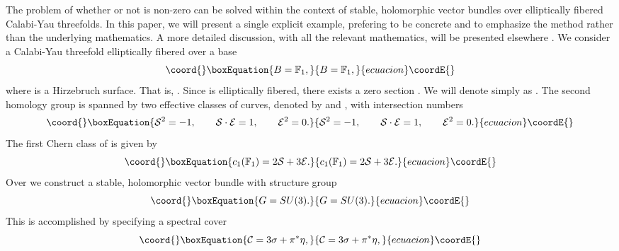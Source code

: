 \documentclass[a4paper,12pt]{article}
\numberwithin{equation}{section}
\theoremstyle{plain}
\begin{document}
The problem of whether or not \coordHE{} is non-zero
can be solved within the context of stable, holomorphic vector bundles
over
elliptically fibered Calabi-Yau threefolds. In this paper, we will present
a single explicit example, prefering to be concrete and to emphasize the
method rather than the underlying mathematics. A more detailed discussion,
with all the relevant mathematics, will be presented elsewhere
\cite{BDOnew}.
We consider a Calabi-Yau threefold \coordHE{} elliptically fibered over a base
%
\begin{equation}\coord{}\boxEquation{
B={\mathbb F}_1,
\label{33}
}{
B={\mathbb F}_1,
}{ecuacion}\coordE{}\end{equation}
%
where \coordHE{} is a Hirzebruch surface. That is,
\coordHE{}. Since \coordHE{} is elliptically fibered, there exists
a zero section \coordHE{}. We will denote
\coordHE{} simply as \myHighlight{$\sigma$}\coordHE{}.
The second homology group \coordHE{} is spanned
by two effective classes of curves, denoted by \coordHE{} and \coordHE{},
with
intersection numbers
%
\begin{equation}\coord{}\boxEquation{
{\cal S}^2 = -1, \qquad {\cal S} \cdot {\cal E} = 1, \qquad
{\cal E}^2 =0.
\label{aaa}
}{
{\cal S}^2 = -1, \qquad {\cal S} \cdot {\cal E} = 1, \qquad
{\cal E}^2 =0.
}{ecuacion}\coordE{}\end{equation}
%
The first Chern class of \coordHE{} is given by
%
\begin{equation}\coord{}\boxEquation{
c_1 ({\mathbb F}_1) = 2{\cal S} + 3{\cal E}.
\label{A}
}{
c_1 ({\mathbb F}_1) = 2{\cal S} + 3{\cal E}.
}{ecuacion}\coordE{}\end{equation}
%
Over \coordHE{} we construct a stable, holomorphic vector bundle \coordHE{} with
structure
group
%
\begin{equation}\coord{}\boxEquation{
G=SU(3).
\label{34}
}{
G=SU(3).
}{ecuacion}\coordE{}\end{equation}
%
This is accomplished \cite{FMW,DO} by specifying a spectral cover
%
\begin{equation}\coord{}\boxEquation{
{\cal C} = 3 \sigma + \pi^{*} \eta ,
\label{35}
}{
{\cal C} = 3 \sigma + \pi^{*} \eta ,
}{ecuacion}\coordE{}\end{equation}
\end{document}
